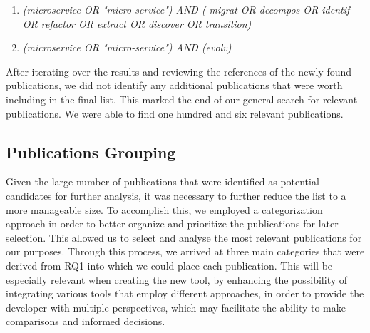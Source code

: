\begin{enumerate}
  \item \emph{(microservice OR "micro-service") AND ( migrat OR decompos OR
    identif OR refactor OR extract OR discover OR transition)}
  \item \emph{(microservice OR "micro-service") AND (evolv)}
\end{enumerate}

After iterating over the results and reviewing the references of the newly
found publications, we did not identify any additional publications that were
worth including in the final list. This marked the end of our general search
for relevant publications. We were able to find one hundred and six relevant
publications.

\subsection{Publications Grouping}

Given the large number of publications that were identified as potential
candidates for further analysis, it was necessary to further reduce the list to
a more manageable size. To accomplish this, we employed a categorization
approach in order to better organize and prioritize the publications for later
selection. This allowed us to select and analyse the most relevant publications
for our purposes. Through this process, we arrived at three main categories
that were derived from RQ1 into which we could place each publication. This
will be especially relevant when creating the new tool, by enhancing the
possibility of integrating various tools that employ different approaches, in
order to provide the developer with multiple perspectives, which may facilitate
the ability to make comparisons and informed decisions.

